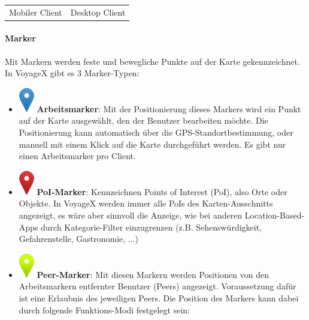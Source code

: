 \begin{table}[H]
\begin{adjustwidth}{-0.7cm}{0.7cm}
\begin{tabulary}{\columnwidth}{ c c }
	Mobiler Client & Desktop Client \\
  \end{tabulary}
  \end{adjustwidth}
\end{table}

\paragraph{Marker}
Mit Markern werden feste und bewegliche Punkte auf der Karte gekennzeichnet. In VoyageX gibt es 3 Marker-Typen:
\begin{itemize}[leftmargin=*,noitemsep,topsep=1ex,parsep=0pt,partopsep=0pt]
\item \includegraphics[scale=0.3]{bilder/marker-icon-blue.png} \textbf{Arbeitsmarker}: Mit der Positionierung dieses Markers wird ein Punkt auf der Karte ausgewählt, den der Benutzer bearbeiten möchte. Die Positionierung kann automatisch über die GPS-Standortbestimmung, oder manuell mit einem Klick auf die Karte durchgeführt werden. Es gibt nur einen Arbeitsmarker pro Client.
\item \includegraphics[scale=0.3]{bilder/marker-icon-red.png} \textbf{PoI-Marker}: Kennzeichnen Points of Interest (PoI), also Orte oder Objekte. In VoyageX werden immer alle PoIs des Karten-Ausschnitts angezeigt, es wäre aber sinnvoll die Anzeige, wie bei anderen Location-Based-Apps durch Kategorie-Filter einzugrenzen (z.B. Sehenswürdigkeit, Gefahrenstelle, Gastronomie, ...)
\item \includegraphics[scale=0.3]{bilder/marker-icon-yellow.png} \textbf{Peer-Marker}: Mit diesen Markern werden Positionen von den Arbeitsmarkern entfernter Benutzer (Peers) angezeigt. Voraussetzung dafür ist eine Erlaubnis des jeweiligen Peers. Die Position des Markers kann dabei durch folgende Funktions-Modi festgelegt sein:

\end{itemize}
